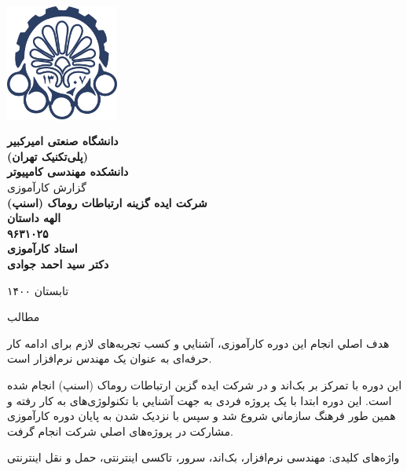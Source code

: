 \documentclass[a4]{report}
\begin{document}
\begin{titlepage}\begin{center}
    \vspace{1cm}
    \includegraphics[height=3.8cm]{fig/fa-logo}

    \vspace{1cm}
    {
        \bfseries{\large دانشگاه صنعتی امیرکبیر}\\
        \normalsize(پلی‌تکنیک تهران)\\
        \large دانشکده مهندسی کامپیوتر\\
    }
    \vspace{1cm}
    {
      \large
        گزارش کارآموزی\\
    }
    \vspace{1cm}
    {
      \bfseries\Large
      شرکت ایده گزینه ارتباطات روماک (اسنپ)\\
    }
    \vspace{0.8cm}
    {
      \bfseries\large
      الهه داستان\\
      ۹۶۳۱۰۲۵\\
    }
    \vspace{0.8cm}
    {
      \bfseries\large
      استاد کارآموزی\\
      دکتر سید احمد جوادی\\
    }



    \vfill
    {\fontsize{16pt}{17pt} تابستان ۱۴۰۰}
\end{center}\end{titlepage}
\newpage

‌مطالب

هدف اصلي انجام این دوره کارآموزی، آشنایي و کسب تجربه‌های لازم برای ادامه کار حرفه‌ای به
عنوان یک مهندس نرم‌افزار است.

این دوره با تمرکز بر بک‌اند و در شرکت ایده گزین ارتباطات روماک (اسنپ) انجام شده است.
این دوره ابتدا با یک پروژه فردی به جهت آشنایي با تکنولوژی‌های به کار رفته و همین طور فرهنگ
سازماني شروع شد و سپس با نزدیک شدن به پایان دوره کارآموزی مشارکت در پروژه‌های اصلي شرکت انجام گرفت.

واژه‌های کلیدی: مهندسی نرم‌افزار، بک‌اند، سرور، تاکسی اینترنتی، حمل و نقل اینترنتی
\end{document}

